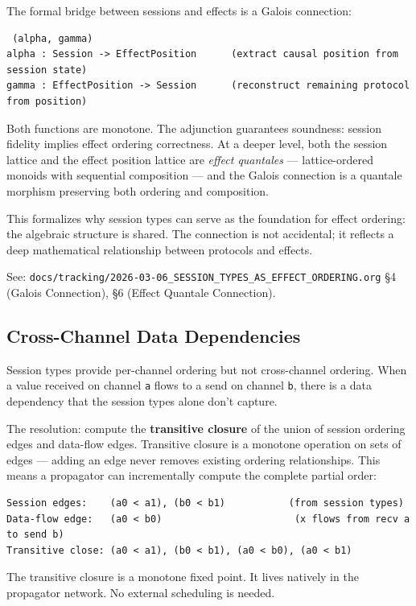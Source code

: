 \documentclass[11pt]{article}
\begin{document}
The formal bridge between sessions and effects is a Galois connection:

\begin{verbatim}
 (alpha, gamma)
alpha : Session -> EffectPosition      (extract causal position from session state)
gamma : EffectPosition -> Session      (reconstruct remaining protocol from position)
\end{verbatim}

Both functions are monotone. The adjunction guarantees soundness: session
fidelity implies effect ordering correctness. At a deeper level, both the
session lattice and the effect position lattice are \emph{effect quantales} ---
lattice-ordered monoids with sequential composition --- and the Galois
connection is a quantale morphism preserving both ordering and composition.

This formalizes why session types can serve as the foundation for effect
ordering: the algebraic structure is shared. The connection is not accidental;
it reflects a deep mathematical relationship between protocols and effects.

See: \texttt{docs/tracking/2026-03-06\_SESSION\_TYPES\_AS\_EFFECT\_ORDERING.org} §4 (Galois
Connection), §6 (Effect Quantale Connection).
\subsection{Cross-Channel Data Dependencies}
\label{sec:org6cdfc43}

Session types provide per-channel ordering but not cross-channel ordering.
When a value received on channel \texttt{a} flows to a send on channel \texttt{b}, there
is a data dependency that the session types alone don't capture.

The resolution: compute the \textbf{transitive closure} of the union of session
ordering edges and data-flow edges. Transitive closure is a monotone
operation on sets of edges --- adding an edge never removes existing ordering
relationships. This means a propagator can incrementally compute the complete
partial order:

\begin{verbatim}
Session edges:    (a0 < a1), (b0 < b1)           (from session types)
Data-flow edge:   (a0 < b0)                       (x flows from recv a to send b)
Transitive close: (a0 < a1), (b0 < b1), (a0 < b0), (a0 < b1)
\end{verbatim}

The transitive closure is a monotone fixed point. It lives natively in the
propagator network. No external scheduling is needed.
\end{document}
